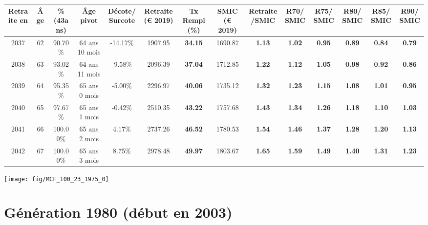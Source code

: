 \begin{adjustbox}{max width=\textwidth} 
\begin{tabular}[htb]{|c|c||c|c|c||c|c||c|c||c|c|c|c|c|} 
\hline 
 Retraite en &  Âge &  \%(43ans) &  Âge pivot &  Décote/Surcote &  Retraite (\euro{} 2019) &  Tx Rempl(\%) &  SMIC (\euro{} 2019) &  Retraite/SMIC &  R70/SMIC &  R75/SMIC &  R80/SMIC &  R85/SMIC &  R90/SMIC \\ 
\hline \hline 
 2037 &  62 &  90.70\% &  64 ans 10 mois &  -14.17\% &  1907.95 &  {\bf 34.15} &  1690.87 &  {\bf 1.13} &  {\bf 1.02} &  {\bf {\color{red} 0.95}} &  {\bf {\color{red} 0.89}} &  {\bf {\color{red} 0.84}} &  {\bf {\color{red} 0.79}} \\ 
\hline 
 2038 &  63 &  93.02\% &  64 ans 11 mois &  -9.58\% &  2096.39 &  {\bf 37.04} &  1712.85 &  {\bf 1.22} &  {\bf 1.12} &  {\bf 1.05} &  {\bf {\color{red} 0.98}} &  {\bf {\color{red} 0.92}} &  {\bf {\color{red} 0.86}} \\ 
\hline 
 2039 &  64 &  95.35\% &  65 ans 0 mois &  -5.00\% &  2296.97 &  {\bf 40.06} &  1735.12 &  {\bf 1.32} &  {\bf 1.23} &  {\bf 1.15} &  {\bf 1.08} &  {\bf 1.01} &  {\bf {\color{red} 0.95}} \\ 
\hline 
 2040 &  65 &  97.67\% &  65 ans 1 mois &  -0.42\% &  2510.35 &  {\bf 43.22} &  1757.68 &  {\bf 1.43} &  {\bf 1.34} &  {\bf 1.26} &  {\bf 1.18} &  {\bf 1.10} &  {\bf 1.03} \\ 
\hline 
 2041 &  66 &  100.00\% &  65 ans 2 mois &  4.17\% &  2737.26 &  {\bf 46.52} &  1780.53 &  {\bf 1.54} &  {\bf 1.46} &  {\bf 1.37} &  {\bf 1.28} &  {\bf 1.20} &  {\bf 1.13} \\ 
\hline 
 2042 &  67 &  100.00\% &  65 ans 3 mois &  8.75\% &  2978.48 &  {\bf 49.97} &  1803.67 &  {\bf 1.65} &  {\bf 1.59} &  {\bf 1.49} &  {\bf 1.40} &  {\bf 1.31} &  {\bf 1.23} \\ 
\hline 
\hline 
\end{tabular} 
\end{adjustbox} 
 
 \vspace{0.1cm} 

 {\hspace{-2.2cm}\texttt{[image: fig/MCF\_100\_23\_1975\_0]}} 

\newpage 
 
\section{Génération 1980 (début en 2003)\label{MCF_100_23_1980_0}} 
 
